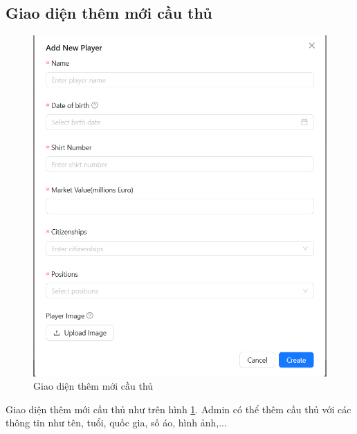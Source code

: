 \documentclass[../BTL.tex]{subfiles}
\begin{document}
\subsection{Giao diện thêm mới cầu thủ}
\begin{figure}
    \centering
    \includegraphics[width=1\linewidth]{Hinhve/admin_add_player.png}
    \caption{Giao diện thêm mới cầu thủ}
    \label{fig:admin_add_player}
\end{figure}
Giao diện thêm mới cầu thủ như trên hình \ref{fig:admin_add_player}. Admin có thể thêm cầu thủ với các thông tin như tên, tuổi, quốc gia, số áo, hình ảnh,...
\end{document}
